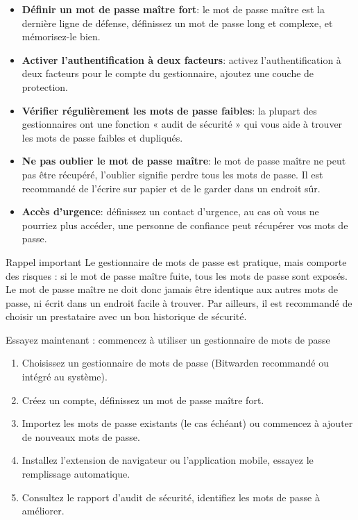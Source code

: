 \begin{itemize}
  \item \textbf{Définir un mot de passe maître fort}: le mot de passe maître est la dernière ligne de défense, définissez un mot de passe long et complexe, et mémorisez-le bien.
  \item \textbf{Activer l'authentification à deux facteurs}: activez l'authentification à deux facteurs pour le compte du gestionnaire, ajoutez une couche de protection.
  \item \textbf{Vérifier régulièrement les mots de passe faibles}: la plupart des gestionnaires ont une fonction « audit de sécurité » qui vous aide à trouver les mots de passe faibles et dupliqués.
  \item \textbf{Ne pas oublier le mot de passe maître}: le mot de passe maître ne peut pas être récupéré, l'oublier signifie perdre tous les mots de passe. Il est recommandé de l'écrire sur papier et de le garder dans un endroit sûr.
  \item \textbf{Accès d'urgence}: définissez un contact d'urgence, au cas où vous ne pourriez plus accéder, une personne de confiance peut récupérer vos mots de passe.
\end{itemize}

\begin{tcbwarn}{Rappel important}
Le gestionnaire de mots de passe est pratique, mais comporte des risques : si le mot de passe maître fuite, tous les mots de passe sont exposés. Le mot de passe maître ne doit donc jamais être identique aux autres mots de passe, ni écrit dans un endroit facile à trouver. Par ailleurs, il est recommandé de choisir un prestataire avec un bon historique de sécurité.

\end{tcbwarn}

\begin{tcbpractice}{Essayez maintenant : commencez à utiliser un gestionnaire de mots de passe}
\begin{enumerate}
  \item Choisissez un gestionnaire de mots de passe (Bitwarden recommandé ou intégré au système).
  \item Créez un compte, définissez un mot de passe maître fort.
  \item Importez les mots de passe existants (le cas échéant) ou commencez à ajouter de nouveaux mots de passe.
  \item Installez l'extension de navigateur ou l'application mobile, essayez le remplissage automatique.
  \item Consultez le rapport d'audit de sécurité, identifiez les mots de passe à améliorer.
\end{enumerate}

\end{tcbpractice}
